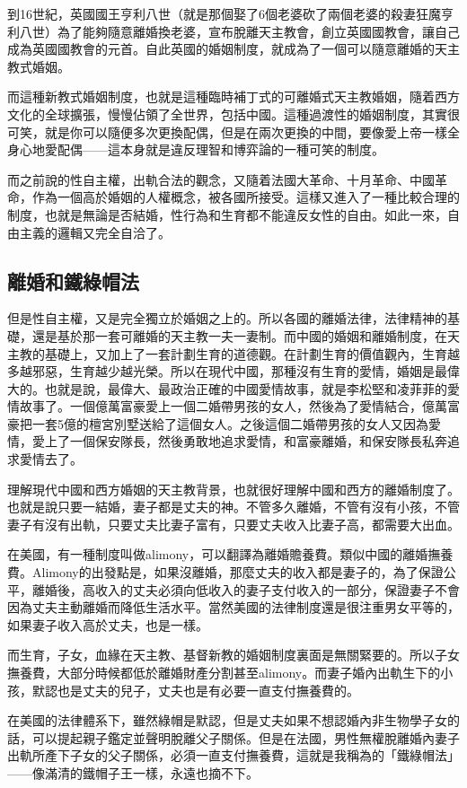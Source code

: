 到16世紀，英國國王亨利八世（就是那個娶了6個老婆砍了兩個老婆的殺妻狂魔亨利八世）為了能夠隨意離婚換老婆，宣布脫離天主教會，創立英國國教會，讓自己成為英國國教會的元首。自此英國的婚姻制度，就成為了一個可以隨意離婚的天主教式婚姻。

而這種新教式婚姻制度，也就是這種臨時補丁式的可離婚式天主教婚姻，隨着西方文化的全球擴張，慢慢佔領了全世界，包括中國。這種過渡性的婚姻制度，其實很可笑，就是你可以隨便多次更換配偶，但是在兩次更換的中間，要像愛上帝一樣全身心地愛配偶——這本身就是違反理智和博弈論的一種可笑的制度。

而之前說的性自主權，出軌合法的觀念，又隨着法國大革命、十月革命、中國革命，作為一個高於婚姻的人權概念，被各國所接受。這樣又進入了一種比較合理的制度，也就是無論是否結婚，性行為和生育都不能違反女性的自由。如此一來，自由主義的邏輯又完全自洽了。

\subsection{離婚和鐵綠帽法}

但是性自主權，又是完全獨立於婚姻之上的。所以各國的離婚法律，法律精神的基礎，還是基於那一套可離婚的天主教一夫一妻制。而中國的婚姻和離婚制度，在天主教的基礎上，又加上了一套計劃生育的道德觀。在計劃生育的價值觀內，生育越多越邪惡，生育越少越光榮。所以在現代中國，那種沒有生育的愛情，婚姻是最偉大的。也就是說，最偉大、最政治正確的中國愛情故事，就是李松堅和凌菲菲的愛情故事了。一個億萬富豪愛上一個二婚帶男孩的女人，然後為了愛情結合，億萬富豪把一套5億的檀宮別墅送給了這個女人。之後這個二婚帶男孩的女人又因為愛情，愛上了一個保安隊長，然後勇敢地追求愛情，和富豪離婚，和保安隊長私奔追求愛情去了。

理解現代中國和西方婚姻的天主教背景，也就很好理解中國和西方的離婚制度了。也就是說只要一結婚，妻子都是丈夫的神。不管多久離婚，不管有沒有小孩，不管妻子有沒有出軌，只要丈夫比妻子富有，只要丈夫收入比妻子高，都需要大出血。

在美國，有一種制度叫做alimony，可以翻譯為離婚贍養費。類似中國的離婚撫養費。Alimony的出發點是，如果沒離婚，那麼丈夫的收入都是妻子的，為了保證公平，離婚後，高收入的丈夫必須向低收入的妻子支付收入的一部分，保證妻子不會因為丈夫主動離婚而降低生活水平。當然美國的法律制度還是很注重男女平等的，如果妻子收入高於丈夫，也是一樣。

而生育，子女，血緣在天主教、基督新教的婚姻制度裏面是無關緊要的。所以子女撫養費，大部分時候都低於離婚財產分割甚至alimony。而妻子婚內出軌生下的小孩，默認也是丈夫的兒子，丈夫也是有必要一直支付撫養費的。

在美國的法律體系下，雖然綠帽是默認，但是丈夫如果不想認婚內非生物學子女的話，可以提起親子鑑定並聲明脫離父子關係。但是在法國，男性無權脫離婚內妻子出軌所產下子女的父子關係，必須一直支付撫養費，這就是我稱為的「鐵綠帽法」——像滿清的鐵帽子王一樣，永遠也摘不下。

